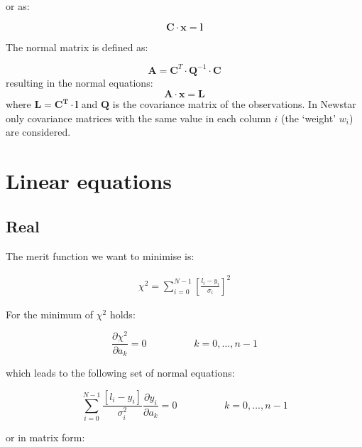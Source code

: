 or as:

\begin{equation}
	\mathbf{C\cdot x}  =  \mathbf{l}
\end{equation}

The normal matrix is defined as:

\begin{equation}
	\mathbf{A} = \mathbf{C}^{T}\cdot\mathbf{Q}^{-1}\cdot\mathbf{C}
\end{equation}
resulting in the normal equations:
\begin{equation}
	\mathbf{A}\cdot\mathbf{x} = \mathbf{L}
\end{equation}
where $\mathbf{L}=\mathbf{C^{T}}\cdot\mathbf{l}$ and
$\mathbf{Q}$ is the covariance matrix of the observations. In Newstar only
covariance matrices with the same value in each column $i$ (the `weight'
$w_{i}$) are considered.

\section{Linear equations}
\subsection{Real}
The merit function we want to minimise is:

\begin{eqnarray}
	\chi^{2} = \sum_{i=0}^{N-1}
	{\left[ \frac{l_{i}-y_{i}}{\sigma_{i}} \right]}^{2}
\label{.e.chir}
\end{eqnarray}

For the minimum of $\chi^{2}$ holds:

\begin{equation}
	\frac{\partial \chi^{2}}{\partial a_{k}} = 0
	\hspace{2cm} k=0,\ldots,n-1
\end{equation}

which leads to the following set of normal equations:

\begin{equation}
	\sum_{i=0}^{N-1} \frac{\left[ l_{i} - y_{i}\right]}{\sigma_{i}^{2}}
	\frac{\partial y_{i}}{\partial a_{k}} = 0
	\hspace{2cm} k=0,\ldots,n-1
\end{equation}

or in matrix form:

